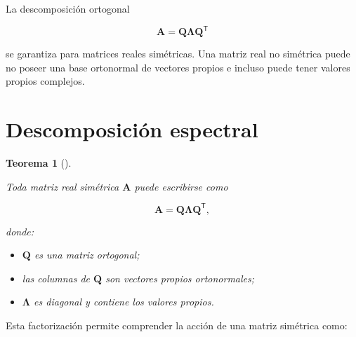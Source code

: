 \documentclass[
  spanish,
  10.5pt,
  letterpaper,
  DIV=11,
  numbers=noendperiod,
  oneside,
  open=any]{scrreprt}
\providecommand{\tightlist}{%
  \setlength{\itemsep}{0pt}\setlength{\parskip}{0pt}}
\theoremstyle{definition}
\theoremstyle{definition}
\theoremstyle{plain}
\newtheorem{theorem}{Teorema}[chapter]
\theoremstyle{remark}
\begin{document}
\begin{tcolorbox}[enhanced jigsaw, arc=.35mm, bottomrule=.15mm, bottomtitle=1mm, breakable, colback=white, colbacktitle=quarto-callout-note-color!10!white, colframe=quarto-callout-note-color-frame, coltitle=black, left=2mm, leftrule=.75mm, opacityback=0, opacitybacktitle=0.6, rightrule=.15mm, title=\textcolor{quarto-callout-note-color}{\faInfo}\hspace{0.5em}{Hipótesis de la descomposición espectral}, titlerule=0mm, toprule=.15mm, toptitle=1mm]

La descomposición ortogonal

\[
\mathbf{A}
=
\mathbf{Q}\boldsymbol{\Lambda}\mathbf{Q}^{\mathsf T}
\]

se garantiza para matrices reales simétricas. Una matriz real no
simétrica puede no poseer una base ortonormal de vectores propios e
incluso puede tener valores propios complejos.

\end{tcolorbox}

\section*{Descomposición espectral}\label{descomposiciuxf3n-espectral}


\begin{theorem}[]\protect\hypertarget{thm-descomposicion-espectral}{}\label{thm-descomposicion-espectral}

Toda matriz real simétrica \(\mathbf{A}\) puede escribirse como

\[
\mathbf{A}
=
\mathbf{Q}
\boldsymbol{\Lambda}
\mathbf{Q}^{\mathsf T},
\]

donde:

\begin{itemize}
\tightlist
\item
  \(\mathbf{Q}\) es una matriz ortogonal;
\item
  las columnas de \(\mathbf{Q}\) son vectores propios ortonormales;
\item
  \(\boldsymbol{\Lambda}\) es diagonal y contiene los valores propios.
\end{itemize}

\end{theorem}

Esta factorización permite comprender la acción de una matriz simétrica
como:
\end{document}
